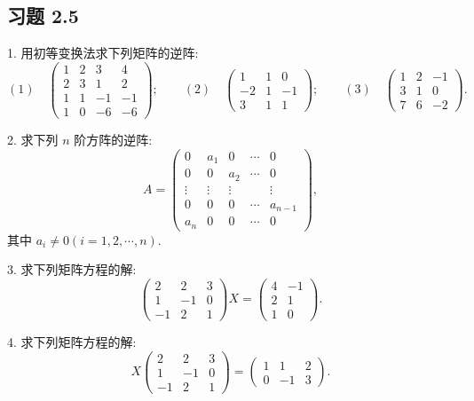 \documentclass[UTF8, 12pt, fontset=fandol, oneside]{ctexart}
\begin{document}
\subsection*{习题 2.5}

1. 用初等变换法求下列矩阵的逆阵:
\[
(1)\quad
\left(\begin{array}{rrrr}
1 & 2 & 3 & 4\\
2 & 3 & 1 & 2\\
1 & 1 & -1 & -1\\
1 & 0 & -6 & -6
\end{array}\right);
\qquad
(2)\quad
\left(\begin{array}{rrr}
1 & 1 & 0\\
-2 & 1 & -1\\
3 & 1 & 1
\end{array}\right);
\qquad
(3)\quad
\left(\begin{array}{rrr}
1 & 2 & -1\\
3 & 1 & 0\\
7 & 6 & -2
\end{array}\right).
\]

2. 求下列 $n$ 阶方阵的逆阵:
\[
A=\left(\begin{array}{ccccc}
0 & a_1 & 0 & \cdots & 0\\
0 & 0 & a_2 & \cdots & 0\\
\vdots & \vdots & \vdots & & \vdots\\
0 & 0 & 0 & \cdots & a_{n-1}\\
a_n & 0 & 0 & \cdots & 0
\end{array}\right),
\]
其中 $a_i\ne 0(i=1,2,\cdots,n)$.

3. 求下列矩阵方程的解:
\[
\left(\begin{array}{rrr}
2 & 2 & 3\\
1 & -1 & 0\\
-1 & 2 & 1
\end{array}\right)X=
\left(\begin{array}{rr}
4 & -1\\
2 & 1\\
1 & 0
\end{array}\right).
\]

4. 求下列矩阵方程的解:
\[
X\left(\begin{array}{rrr}
2 & 2 & 3\\
1 & -1 & 0\\
-1 & 2 & 1
\end{array}\right)=
\left(\begin{array}{rrr}
1 & 1 & 2\\
0 & -1 & 3
\end{array}\right).
\]
\end{document}
